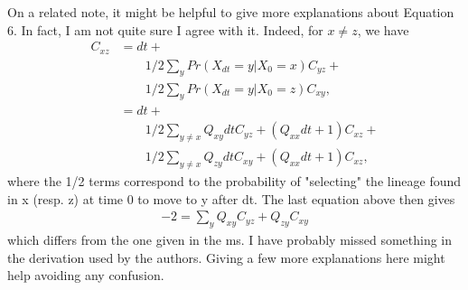 \begin{point}{}
    On a related note, it might be helpful to give more explanations about Equation 6. In
    fact, I am not quite sure I agree with it. Indeed, for $x \neq z$, we have
    \begin{align*}
        C_{xz} &= dt + {} \\
                & \qquad
             1/2 \sum_y Pr(X_{dt} = y | X_0 = x) C_{yz} + {} \\
                & \qquad
             1/2 \sum_y Pr(X_{dt} = y | X_0 = z) C_{xy}, \\
           &= dt + {} \\
                & \qquad
             1/2 \sum_{y \neq x} Q_{xy} dt C_{yz} + (Q_{xx} dt + 1) C_{xz} + \\
                & \qquad
             1/2 \sum_{y \neq x} Q_{zy} dt C_{xy} + (Q_{xx} dt + 1) C_{xz},
    \end{align*}
    where the 1/2 terms correspond to the probability of "selecting" the lineage found in x
    (resp. z) at time 0 to move to y after dt. The last equation above then gives
    \begin{align*}
        -2 = \sum_y Q_{xy} C_{yz} + Q_{zy} C_{xy}
    \end{align*}
    which differs from the one given in the ms. I have probably missed something in the derivation
    used by the authors. Giving a few more explanations here might help avoiding any confusion.
\end{point}



